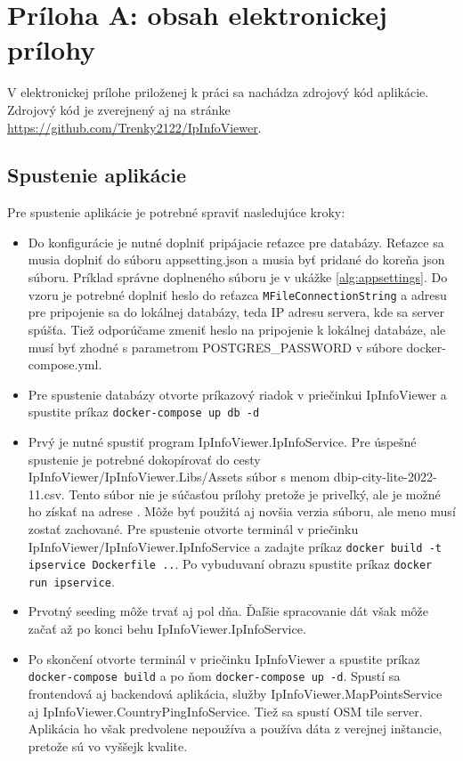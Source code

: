 \chapter*{Príloha A: obsah elektronickej prílohy}

V elektronickej prílohe priloženej k práci sa nachádza zdrojový kód
aplikácie. Zdrojový kód je
zverejnený aj na stránke \url{https://github.com/Trenky2122/IpInfoViewer}.

\section*{Spustenie aplikácie}

Pre spustenie aplikácie je potrebné spraviť nasledujúce kroky:
\begin{itemize}
    \item Do konfigurácie je nutné doplniť pripájacie reťazce pre databázy.
    Reťazce sa musia doplniť do súboru appsetting.json a musia byť pridané do koreňa json súboru.
    Príklad správne doplneného súboru je v ukážke \ref{alg:appsettings}. Do vzoru je potrebné doplniť
    heslo do reťazca \lstinline{MFileConnectionString} a adresu pre pripojenie sa do lokálnej databázy,
    teda IP adresu servera, kde sa server spúšťa. Tiež odporúčame zmeniť heslo na pripojenie k lokálnej 
    databáze, ale musí byť zhodné s parametrom POSTGRES\_PASSWORD v súbore docker-compose.yml.
    \item Pre spustenie databázy otvorte príkazový riadok v priečinkui IpInfoViewer a spustite 
    príkaz \lstinline{docker-compose up db -d}
    \item Prvý je nutné spustiť program IpInfoViewer.IpInfoService. Pre úspešné spustenie je potrebné dokopírovať
    do cesty IpInfoViewer/IpInfoViewer.Libs/Assets súbor s menom dbip-city-lite-2022-11.csv. Tento súbor nie je 
    súčasťou prílohy pretože je priveľký, ale je možné ho získať na adrese \cite{ip_city_db}. Môže byť použitá 
    aj novšia verzia súboru, ale meno musí zostať zachované. Pre spustenie otvorte terminál v priečinku 
    IpInfoViewer/IpInfoViewer.IpInfoService a zadajte príkaz \lstinline{docker build -t ipservice Dockerfile ..}. Po
    vybuduvaní obrazu spustite príkaz \lstinline{docker run ipservice}.
    \item Prvotný seeding môže trvať aj pol dňa. Ďaľšie spracovanie dát však môže začať až po konci 
    behu IpInfoViewer.IpInfoService.
    \item Po skončení otvorte terminál v priečinku IpInfoViewer a spustite príkaz \lstinline{docker-compose build}
    a po ňom \lstinline{docker-compose up -d}. Spustí sa frontendová aj backendová aplikácia, služby IpInfoViewer.MapPointsService
    aj IpInfoViewer.CountryPingInfoService. Tiež sa spustí OSM tile server. Aplikácia ho však predvolene nepoužíva a používa dáta z 
    verejnej inštancie, pretože sú vo vyššejk kvalite.
\end{itemize}
